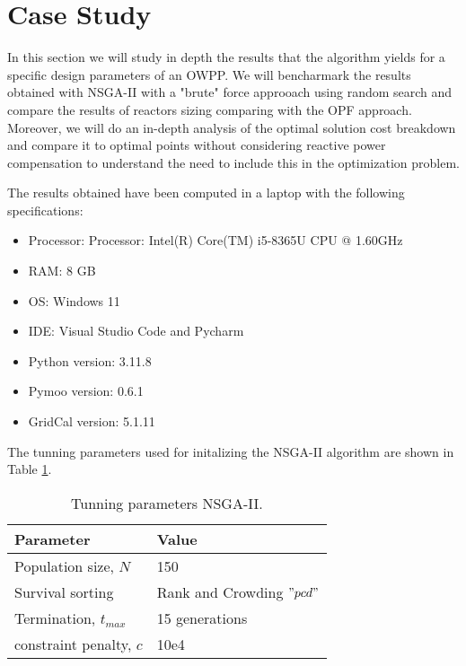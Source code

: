 \documentclass[a4paper,11pt, titlepage, twoside]{article}
\begin{document}
\section{Case Study}\label{CaseStudies}

In this section we will study in depth the results that the algorithm yields for a specific design parameters
of an OWPP. We will bencharmark the results obtained with NSGA-II with a "brute" force approoach using random search and compare the results of reactors sizing comparing with the OPF
approach. Moreover, we will do an in-depth analysis of the optimal solution cost breakdown and compare it to optimal points without considering reactive power compensation to understand the need
to include this in the optimization problem.



The results obtained have been computed in a laptop with the following specifications:
\begin{itemize}
    \item Processor: Processor: Intel(R) Core(TM) i5-8365U CPU @ 1.60GHz
    \item RAM: 8 GB
    \item OS: Windows 11
    \item IDE: Visual Studio Code and Pycharm
    \item Python version: 3.11.8
    \item Pymoo version: 0.6.1
    \item GridCal version: 5.1.11
\end{itemize}

The tunning parameters used for initalizing the NSGA-II algorithm are shown in Table \ref{tab:NSGAII_parameters}.

\begin{table}[h]
\centering
    \begin{tabular}{l|l}
    \hline
    \textbf{Parameter} & \textbf{Value} \\ \hline
    Population size, $N$ & 150 \\ \hline
    Survival sorting & Rank and Crowding $"pcd"$ \\ \hline
    Termination, $t_{max}$  & 15 generations \\ \hline
    constraint penalty, $c$ & 10e4 \\ \hline
    \end{tabular}
    \caption{Tunning parameters NSGA-II.}
    \label{tab:NSGAII_parameters}
\end{table}
\end{document}
